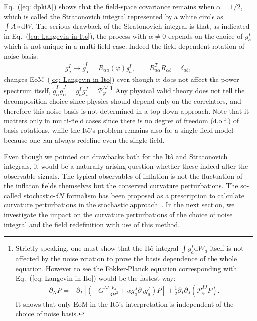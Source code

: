 \documentclass[aps, prd
, preprint
, nofootinbib 
, superscriptaddress
, longbibliography
]{revtex4-1}
\newcommand{\dd}{\mathrm{d}}
\newcommand{\calP}{\mathcal{P}}
\newcommand{\bae}[1]{\begin{align} #1 \end{align}}
\begin{document}
Eq.~(\ref{eq: dphiA}) shows that the field-space covariance remains when $\alpha=1/2$, which is called the Stratonovich integral
represented by a white circle as $\int A\circ\dd W$. 
The serious drawback of the Stratonovich integral is that, as indicated in Eq.~(\ref{eq: Langevin in Ito}), the process with $\alpha\neq0$ depends on the choice of $g^I_a$ which
is not unique in a multi-field case. Indeed the field-dependent rotation of noise basis:
\bae{
	g^I_a\to \tilde{g}^I_\alpha=R_{\alpha a}(\varphi)g^I_a, \qquad R^T_{a\alpha}R_{\alpha b}=\delta_{ab},
}
changes EoM~(\ref{eq: Langevin in Ito}) even though it does not affect the power spectrum itself, 
$\tilde{g}^I_\alpha\tilde{g}^J_\alpha=g^I_ag^J_a=\calP_\varphi^{IJ}$.\footnote{Strictly speaking, one must show that the It\^o integral $\int g^I_a\dd W_a$ itself is not affected 
by the noise rotation to prove the basis dependence of the whole equation. However to see the Fokker-Planck equation corresponding with 
Eq.~(\ref{eq: Langevin in Ito}) would be the fastest way:
\bae{
	\partial_NP=-\partial_I\left[\left(-G^{IJ}\frac{V_J}{3H^2}+\alpha g^J_a\partial_Jg^I_a\right)P\right]+\frac{1}{2}\partial_I\partial_J\left(\calP_\varphi^{IJ}P\right).
}
It shows that only EoM in the It\^o's interpretation is independent of the choice of noise basis.}
Any physical valid theory does not tell the decomposition choice since physics should depend only on the correlators,
and therefore this noise basis is not determined in a top-down approach.
Note that it matters only in multi-field cases since there is no degree of freedom (d.o.f.) of basis rotations, while
the It\^o's problem remains also for a single-field model because one can always redefine even the single field.

Even though we pointed out drawbacks both for the It\^o and Stratonovich integrals, it would be a naturally arising question whether
these indeed alter the observable signals. The typical observables of inflation is not the fluctuation of the inflaton fields themselves but the conserved curvature perturbations.
The so-called stochastic-$\delta N$ formalism has been proposed as a prescription to calculate curvature perturbations in the stochastic approach~\cite{Fujita:2013cna,
Fujita:2014tja,Vennin:2015hra}. In the next section, we investigate the impact on the curvature perturbations of the choice of noise integral and the field redefinition
with use of this method.
\end{document}

